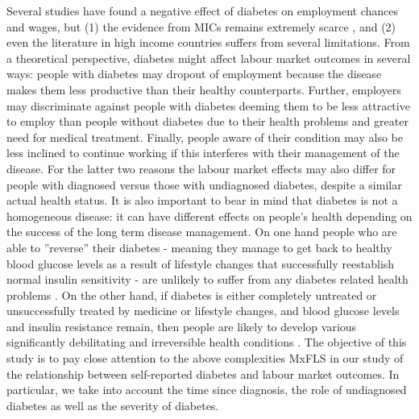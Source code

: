Several studies have found a negative effect of diabetes on employment
chances and wages, but (1) the evidence from \ac{MICs} remains
extremely scarce \citep{Seuring2015a}, and (2) even the literature
in high income countries suffers from several limitations. From a
theoretical perspective, diabetes might affect labour market outcomes
in several ways:
people with diabetes may dropout
of employment because the disease makes them less productive than
their healthy counterparts. Further, employers may discriminate against
people with diabetes deeming them to be less attractive to employ
than people without diabetes due to their health problems and greater
need for medical treatment. Finally, people aware of their condition
may also be less inclined to continue working if this interferes with
their management of the disease. For the latter two reasons the labour
market effects may also differ for people with diagnosed versus those
with undiagnosed diabetes, despite a similar actual health status.
It is also important to bear in mind that diabetes is not a homogeneous
disease: it can have different effects on people's health depending
on the success of the long term disease management. On one hand people
who are able to ''reverse'' their diabetes - meaning they manage
to get back to healthy blood glucose levels as a result of lifestyle
changes that successfully reestablish normal insulin sensitivity -
are unlikely to suffer from any diabetes related health problems \citep{Lim2011,Gregg2012}.
On the other hand, if diabetes is either completely untreated or unsuccessfully
treated by medicine or lifestyle changes, and blood glucose levels
and insulin resistance remain, then people are likely to develop various
significantly debilitating and irreversible health conditions \citep{Reynoso-Noveron2011}.
The objective of this study is to pay close attention to the above
complexities \acf{MxFLS} in our study of the relationship between
self-reported diabetes and labour market outcomes. In particular,
we take into account the time since diagnosis, the role of undiagnosed
diabetes as well as the severity of diabetes. %
